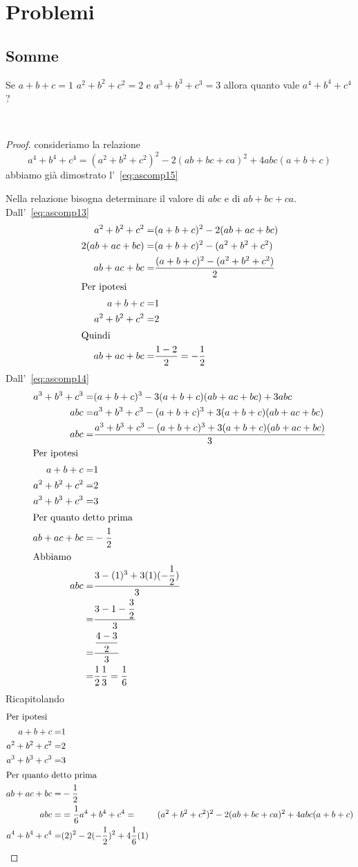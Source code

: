 \chapter{Problemi}
\section{Somme}
\begin{prob}
Se $a+b+c=1$ $a^2+b^2+c^2=2$ e $a^3+b^3+c^3=3$ allora quanto vale $a^4+b^4+c^4$?
\end{prob}~\cite{Gregorio2021}
\begin{proof}
consideriamo la relazione \[a^4+b^4+c^4=(a^2+b^2+c^2)^2-2(ab+bc+ca)^2+4abc(a+b+c)\] abbiamo già dimostrato l'~\vref{eq:ascomp15}

Nella relazione bisogna determinare il valore di $abc$ e di $ab+bc+ca$.
Dall'~\vref{eq:ascomp13}
\begin{align*}
a^2+b^2+c^2=&(a+b+c)^2-2(ab+ac+bc)\\
2(ab+ac+bc)=&(a+b+c)^2-(a^2+b^2+c^2)\\
ab+ac+bc=&\dfrac{(a+b+c)^2-(a^2+b^2+c^2)}{2}\\
\intertext{Per ipotesi}
a+b+c=&1\\
a^2+b^2+c^2=&2\\
\intertext{Quindi}
ab+ac+bc=&\dfrac{1-2}{2}=-\dfrac{1}{2}\\
\end{align*}
Dall'~\vref{eq:ascomp14}
\begin{align*}
	a^3+b^3+c^3=&{}(a+b+c)^3-3(a+b+c)(ab+ac+bc)+3abc\\
	abc=&a^3+b^3+c^3-(a+b+c)^3+3(a+b+c)(ab+ac+bc)\\
	abc=&	\dfrac{a^3+b^3+c^3-(a+b+c)^3+3(a+b+c)(ab+ac+bc)}{3}\\
	\intertext{Per ipotesi}
	a+b+c=&1\\
	a^2+b^2+c^2=&2\\
	a^3+b^3+c^3=&3\\
	\intertext{Per quanto detto prima}
	ab+ac+bc=&-\dfrac{1}{2}\\
	\intertext{Abbiamo}
	abc=&	\dfrac{3-(1)^3+3(1)(-\dfrac{1}{2})}{3}\\
	=&\dfrac{3-1-\dfrac{3}{2}}{3}\\
	=&\dfrac{\dfrac{4-3}{2}}{3}\\
	=&\dfrac{1}{2}\dfrac{1}{3}=\dfrac{1}{6}
\end{align*}
Ricapitolando
\begin{align*}
		\intertext{Per ipotesi}
	a+b+c=&1\\
	a^2+b^2+c^2=&2\\
	a^3+b^3+c^3=&3\\
	\intertext{Per quanto detto prima}
	ab+ac+bc=&-\dfrac{1}{2}\\
	abc=&=\dfrac{1}{6}
	a^4+b^4+c^4=&(a^2+b^2+c^2)^2-2(ab+bc+ca)^2+4abc(a+b+c)\\
	a^4+b^4+c^4=&(2)^2-2(-\dfrac{1}{2})^2+4\dfrac{1}{6}(1)\\
\end{align*}
\end{proof}